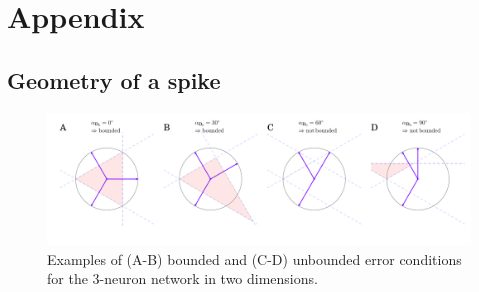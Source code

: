 \documentclass[twoside,twocolumn]{article}
\begin{document}
 

\clearpage
\section*{Appendix}

\subsection*{Geometry of a spike}
\begin{figure}[!ht]
\centering
  \includegraphics[width=\textwidth]{../plots/2simplex.pdf}
  \caption{Examples of (A-B) bounded and (C-D) unbounded error conditions for the 3-neuron network in two dimensions.}
  \label{fig:N3}
\end{figure}
\end{document}
